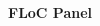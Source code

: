 \documentclass[a3paper]{article}
\begin{document}
\printGenericVSLHeaderBig
\begin{center}
\begin{vsltext}{4cm}{4.5cm}

    \vspace{5.5cm}

    \textbf{FLoC Panel} 


\end{vsltext}

\end{center}
\end{document}
